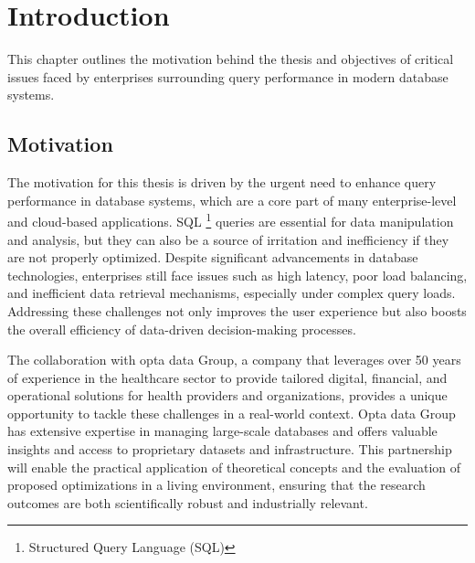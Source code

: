 \section{Introduction}
This chapter outlines the motivation behind the thesis and objectives of critical issues faced by enterprises surrounding query performance in modern database systems.
\subsection{Motivation}
The motivation for this thesis is driven by the urgent need to enhance query performance in database systems, which are a core part of many enterprise-level and cloud-based applications. SQL \footnote{Structured Query Language (SQL)} queries are essential for data manipulation and analysis, but they can also be a source of irritation and inefficiency if they are not properly optimized. Despite significant advancements in database technologies, enterprises still face issues such as high latency, poor load balancing, and inefficient data retrieval mechanisms, especially under complex query loads. Addressing these challenges not only improves the user experience but also boosts the overall efficiency of data-driven decision-making processes.\vspace{.4cm}

The collaboration with opta data Group, a company that leverages over 50 years of experience in the healthcare sector to provide tailored digital, financial, and operational solutions for health providers and organizations, provides a unique opportunity to tackle these challenges in a real-world context. Opta data Group has extensive expertise in managing large-scale databases and offers valuable insights and access to proprietary datasets and infrastructure. This partnership will enable the practical application of theoretical concepts and the evaluation of proposed optimizations in a living environment, ensuring that the research outcomes are both scientifically robust and industrially relevant. \vspace{.3cm}

